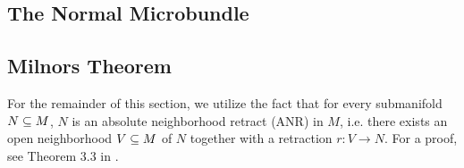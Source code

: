 \subsection*{The Normal Microbundle}\label{section::normal}



\subsection*{Milnors Theorem}\label{section::milnor}

\begin{myparagraph}
    For the remainder of this section,
    we utilize the fact that for every submanifold $N \subseteq{} M$,
    $N$ is an absolute neighborhood retract (ANR) in $M$,
    i.e. there exists an open neighborhood $V \subseteq{} M$ of $N$
    together with a retraction $r: V \to N$.
    For a proof, see Theorem 3.3 in \cite{hanner}.
    
\end{myparagraph}
% 

